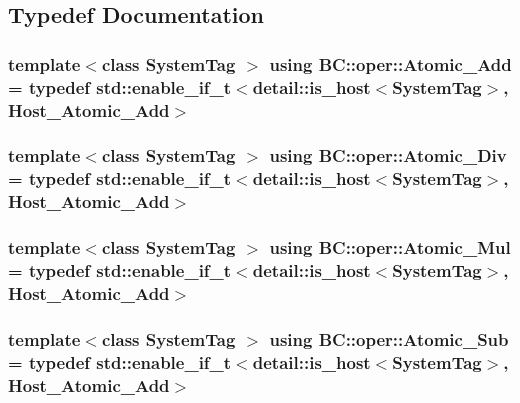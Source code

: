 \subsection{Typedef Documentation}
\subsubsection[{\texorpdfstring{Atomic\+\_\+\+Add}{Atomic_Add}}]{\setlength{\rightskip}{0pt plus 5cm}template$<$class System\+Tag $>$ using {\bf B\+C\+::oper\+::\+Atomic\+\_\+\+Add} = typedef std\+::enable\+\_\+if\+\_\+t$<$detail\+::is\+\_\+host$<$System\+Tag$>$, {\bf Host\+\_\+\+Atomic\+\_\+\+Add}$>$}\hypertarget{namespaceBC_1_1oper_aca3a597a9ebcb5e6fa875a1a0b52d3ac}{}\label{namespaceBC_1_1oper_aca3a597a9ebcb5e6fa875a1a0b52d3ac}
\subsubsection[{\texorpdfstring{Atomic\+\_\+\+Div}{Atomic_Div}}]{\setlength{\rightskip}{0pt plus 5cm}template$<$class System\+Tag $>$ using {\bf B\+C\+::oper\+::\+Atomic\+\_\+\+Div} = typedef std\+::enable\+\_\+if\+\_\+t$<$detail\+::is\+\_\+host$<$System\+Tag$>$, {\bf Host\+\_\+\+Atomic\+\_\+\+Add}$>$}\hypertarget{namespaceBC_1_1oper_aececff80cbd6fbd7c83446b354dc303e}{}\label{namespaceBC_1_1oper_aececff80cbd6fbd7c83446b354dc303e}
\subsubsection[{\texorpdfstring{Atomic\+\_\+\+Mul}{Atomic_Mul}}]{\setlength{\rightskip}{0pt plus 5cm}template$<$class System\+Tag $>$ using {\bf B\+C\+::oper\+::\+Atomic\+\_\+\+Mul} = typedef std\+::enable\+\_\+if\+\_\+t$<$detail\+::is\+\_\+host$<$System\+Tag$>$, {\bf Host\+\_\+\+Atomic\+\_\+\+Add}$>$}\hypertarget{namespaceBC_1_1oper_abd0077be15aa6230d105ec70a2364997}{}\label{namespaceBC_1_1oper_abd0077be15aa6230d105ec70a2364997}
\subsubsection[{\texorpdfstring{Atomic\+\_\+\+Sub}{Atomic_Sub}}]{\setlength{\rightskip}{0pt plus 5cm}template$<$class System\+Tag $>$ using {\bf B\+C\+::oper\+::\+Atomic\+\_\+\+Sub} = typedef std\+::enable\+\_\+if\+\_\+t$<$detail\+::is\+\_\+host$<$System\+Tag$>$, {\bf Host\+\_\+\+Atomic\+\_\+\+Add}$>$}\hypertarget{namespaceBC_1_1oper_aa1af7d6c0a6282ac0f17e77d125eb351}{}\label{namespaceBC_1_1oper_aa1af7d6c0a6282ac0f17e77d125eb351}


